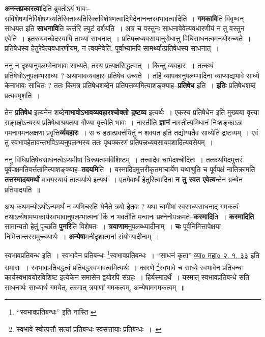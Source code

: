 \documentclass[article,12pt,a4paper]{memoir}
\begin{document}
	  \endgroup
	

	  \pstart \textbf{अनन्तप्रकारत्वा}दिति ब्रुवतोऽयं भावः--सविशेषणनिर्विशेषणव्यतिरिक्ताव्यतिरिक्तविशेषणत्वादिभेदेनानन्तस्वभावत्वादिति । \textbf{गमकावि}ति विवृण्वन् साधयत इति \textbf{साधनावि}ति कर्त्तरि ल्युटं दर्शयति । अत्र च वस्तुनः साधनावेवेत्यवधारणीयं न तु वस्तुन एवेति । इतरव्यवच्छेदस्यापि ताभ्यां साधनात् । प्रतिपत्त्रध्यवसायानुरोधात्तु विधिसाधनत्वमनयोरुच्यते । प्रतिषेधस्य हेतुरेवेत्यवधारणीयम्, न त्वयमेवेति, पूर्वाभ्यामपि सामर्थ्यात्प्रतिषेधस्य साधनात् ।
	\pend
      

	  \pstart ननु न दृश्यानुपलम्भेनाभावः साध्यते, तस्य प्रत्यक्षसिद्धत्वात् । किन्तु व्यवहारः । तत्कथं प्रतिषेधोऽनुपलम्भसाध्यः ? अथाभावव्यवहारः प्रतिषेध उच्यते । तर्हि व्यापकानुपलम्भादिना व्याप्याद्यभावे साध्ये केनाभावः साधितः ? ततः किमत्र प्रतिषेधशब्देन प्रतिपत्तव्यमित्याशङ्क्याह--\textbf{प्रतिषेध} इति । \textbf{इतिः} प्रतिषेधशब्दं प्रत्यवमृशति ।
	\pend
      

	  \pstart तेन \textbf{प्रतिषेध} इत्यनेन शब्दे\textbf{नाभावोऽभावव्यवहारश्चोक्तो द्रष्टव्य} इत्यर्थः । एकस्य प्रतिषेधेन इति मुख्यया वृत्त्या सङ्ग्रहोऽन्यस्य प्रतिषेधाश्रयतया गौण्या वृत्त्येति भावः । नास्तीति \textbf{ज्ञानं} नास्तीत्यभिधानं निःशङ्काऽत्र गमनागमनलक्षणा प्रवृत्ति\textbf{र्व्यवहारः} । स च हठात्प्रवर्त्तयितुं न शक्यत इति तद्योग्यतैव साध्येति द्रष्टव्यम् । एवं तु स्वभावहेतावन्तर्भावेऽप्यनुपलम्भस्य ततः पृथक्करणं प्रतिपत्त्रध्यवसायवशादित्यवसेयम् ।
	\pend
      

	  \pstart ननु विधिप्रतिषेधसाधनत्वेऽप्यमीषां त्रिरूपत्वमविशिष्टम् । तत्त्वादेव चाभेदश्चोदितः । तत्कथमिदमुत्तरं पूर्वपक्षमतिवर्त्ततामित्याशङ्क्याह--\textbf{तदयमि}ति । यस्मादिदमुत्तरीकृतमाचार्येण यथाश्रुति च पूर्वपक्षं नातिक्रामति \textbf{तत्तस्मादयमर्थो} वाक्यस्यायं तात्पर्यार्थ इत्यर्थः । एतमेवार्थं हेतुरित्यादिना \textbf{न तु स्वत एवेत्य}न्तेन ग्रन्थेन प्रतिपादयति ॥
	\pend
      

	  \pstart अथ कथमन्योऽर्थोऽन्यमर्थं न व्यभिचरति येनैते त्रयो हेतवः ? य\leavevmode{}था चामीषां स्वसाध्यसाधनाद् गमकत्वं तथाऽन्येषामप्यकार्यस्वभावानुपलम्भात्मनां किं न भवतीति मन्वानः प्रश्नेनोपक्रमते--\textbf{कस्मादि}ति । \textbf{कस्मादिति} सामान्यतो हेतुं पृच्छति \textbf{पुनरि}ति विशेषतः । \textbf{त्रयाणाम}नुपलब्ध्यादीनाम् । \textbf{चः} पूर्वनिमित्तापेक्षया निमित्तान्तरसमुच्चयार्थः । \textbf{अन्येषा}मनीदृशात्मनां संयोग्यादीनाम् ।
	\pend
      \leavevmode{}
	  \bigskip
	  \begingroup
	

	  \pstart स्वभावप्रतिबन्ध इति । स्वभावेन प्रतिबन्धः \footnote{“स्वभावप्रतिबन्धः” इति नास्ति \cite{dp-msC}}स्वभावप्रतिबन्धः । “साधनं कृता” \href{http://http://sarit.indology.info/?cref=vk-mbh.2.1.33}{व्या०
	    महा० २. १. ३३} इति समासः । स्वभावप्रतिबद्धत्वं प्रतिबद्धस्वभावत्वमित्यर्थः । कारणे \footnote{स्वभावे स्वोत्पत्तौ सत्यां प्रतिबन्धः स्वसत्तायाः प्रतिबन्धः ।--\cite{dp-msD-n}}स्वभावे च साध्ये स्वभावेन प्रतिबन्धः कार्यस्वभावयोरविशिष्ट इत्येकेन समासेन द्वयोरपि संग्रहः । हिर्यस्मादर्थे । यस्मात् स्वभावप्रतिबन्धे सति साधनार्थः साध्यार्थ गमयेत्, तस्मात् त्रयाणां गमकत्वम्, अन्येषामगमकत्वम् ॥
	\pend
       
\end{document}

